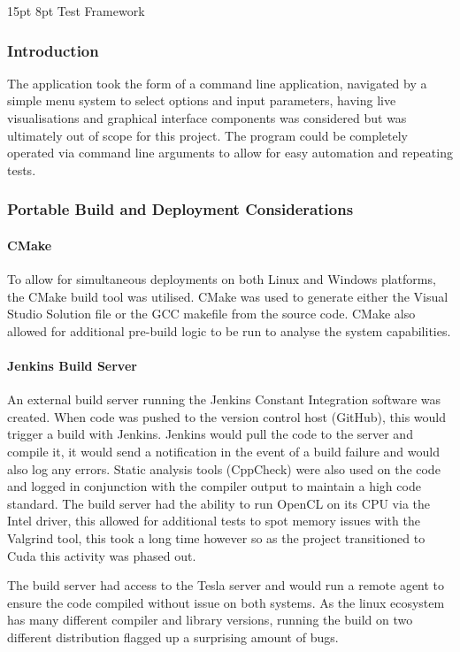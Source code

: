 \documentclass[12pt,a4paper]{article}
\makeatletter
\renewcommand\subsection{\@startsection {subsection}{1}{2mm} %
                               {15pt} %
                               {8pt} %
                               {\fontsize{13pt}{1em}\bfseries}}
\makeatother
\begin{document}
\subsection{Test Framework}
\subsubsection{Introduction}
The application took the form of a command line application, navigated by a simple menu system to select options and input parameters, having live visualisations and graphical interface components was considered but was ultimately out of scope for this project.
The program could be completely operated via command line arguments to allow for easy automation and repeating tests.

\subsubsection{Portable Build and Deployment Considerations}

\paragraph{CMake}
To allow for simultaneous deployments on both Linux and Windows platforms, the CMake build tool was utilised. CMake was used to generate either the Visual Studio Solution file or the GCC makefile from the source code. CMake also allowed for additional pre-build logic to be run to analyse the system capabilities.
 
\paragraph{Jenkins Build Server}
An external build server running the Jenkins Constant Integration software was created. When code was pushed to the version control host (GitHub), this would trigger a build with Jenkins. Jenkins would pull the code to the server and compile it, it would send a notification in the event of a build failure and would also log any errors. Static analysis tools (CppCheck) were also used on the code and logged in conjunction with the compiler output to maintain a high code standard. The build server had the ability to run OpenCL on its CPU via the Intel driver, this allowed for additional tests to spot memory issues with the Valgrind tool, this took a long time however so as the project transitioned to Cuda this activity was phased out.

The build server had access to the Tesla server and would run a remote agent to ensure the code compiled without issue on both systems. As the linux ecosystem has many different compiler and library versions, running the build on two different distribution flagged up a surprising amount of bugs.
\end{document}
